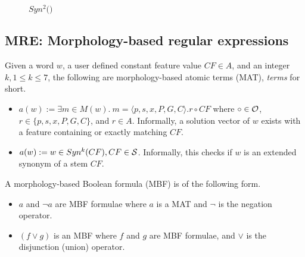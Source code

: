 \begin{figure}[tb!]
\begin{center}
\vspace{-2.5em}
\caption{$Syn^2($$)$}
\vspace{-3em}
\label{fig:introsynEx}
\end{center}
\end{figure}

\subsection{MRE: Morphology-based regular expressions}
\label{subsec:grammar}

Given a word $w$,
a user defined constant feature value $CF\in A$,
and an integer $k, 1\le k\le 7$, 
the following are morphology-based atomic terms (MAT), {\em terms} for short.
\begin{itemize}
  \item $a(w):= \exists m \in M(w).~m=\langle p,s,x,P,G,C\rangle. r \circ CF$
where $\circ \in {\cal O}$, $r \in \{p,s,x,P,G,C\}$, and $r\in A$.
Informally, a solution vector of $w$ exists with
a feature containing or exactly matching  $CF$.
\item $a(w) := w \in Syn^k(CF), CF \in \ss$.
  Informally, this checks if $w$ is an extended synonym of a stem $CF$. 
\end{itemize}

A morphology-based Boolean formula (MBF) is of the following form.
\begin{itemize}
  \item $a$ and $\neg a$ are MBF formulae where $a$ is a MAT and $\neg$ is the negation operator. 
  \item $(f \vee g)$ is an MBF where $f$ and $g$ are MBF formulae, 
    and $\vee$ is the disjunction (union) operator. 
\end{itemize}

